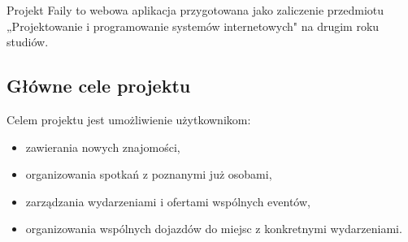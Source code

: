\documentclass[12pt,a4paper]{article}
\begin{document}
Projekt Faily to webowa aplikacja przygotowana jako zaliczenie przedmiotu „Projektowanie i programowanie systemów internetowych" na drugim roku studiów.

\subsection{Główne cele projektu}

Celem projektu jest umożliwienie użytkownikom:
\begin{itemize}[itemsep=0pt]
    \item zawierania nowych znajomości,
    \item organizowania spotkań z poznanymi już osobami,
    \item zarządzania wydarzeniami i ofertami wspólnych eventów,
    \item organizowania wspólnych dojazdów do miejsc z konkretnymi wydarzeniami.
\end{itemize}

\newpage
\end{document}
